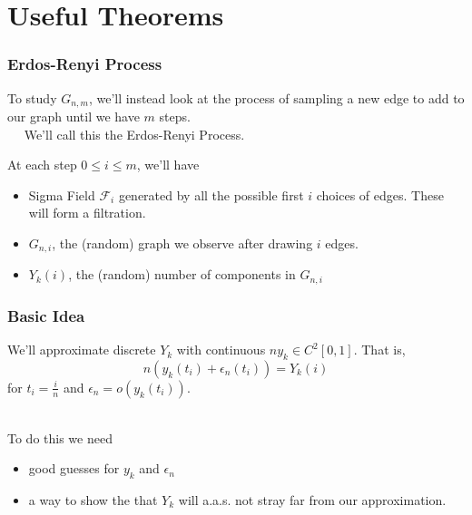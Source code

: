 \documentclass{beamer}
\begin{document}
\section{Useful Theorems}

\begin{frame}
\frametitle{Erdos-Renyi Process}

To study \(G_{n, m}\), we'll instead look at the process of sampling a new edge to add to our graph until we have \(m\) steps. \\~\
\pause
We'll call this the Erdos-Renyi Process.

At each step \(0 \leq i \leq m\), we'll have
\begin{itemize}
    \item Sigma Field \(\mathcal{F}_{i}\) generated by all the possible first \(i\) choices of edges. These will form a filtration. \pause
    \item \(G_{n, i}\), the (random) graph we observe after drawing \(i\) edges. \pause
    \item \(Y_{k}(i)\), the (random) number of components in \(G_{n, i}\)
\end{itemize}

\end{frame}


\begin{frame}
\frametitle{Basic Idea}

We'll approximate discrete \(Y_{k}\) with continuous \(ny_{k} \in C^{2}[0, 1]\). That is,
\[n(y_{k}(t_{i}) + \epsilon_{n}(t_{i})) = Y_{k}(i)\]
for \(t_{i} = \frac{i}{n}\) and \(\epsilon_{n} = o(y_{k}(t_{i})) \). \\~\

\pause
To do this we need
\begin{itemize}
  \item good guesses for \(y_{k}\) and \(\epsilon_{n}\) \pause
  \item a way to show the that \(Y_{k}\) will a.a.s. not stray far from our approximation.
\end{itemize}


\end{frame}
\end{document}
